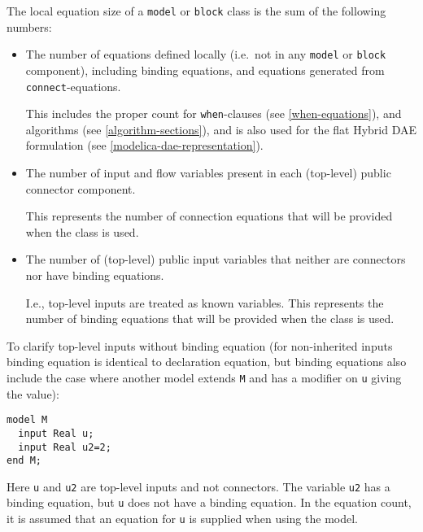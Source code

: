 \begin{definition}
The local equation size of a \lstinline!model! or \lstinline!block! class is the sum of the following numbers:
\begin{itemize}
\item
  The number of equations defined locally (i.e.\ not in any \lstinline!model! or \lstinline!block! component), including binding equations, and equations generated from \lstinline!connect!-equations.
  \begin{nonnormative}
  This includes the proper count for \lstinline!when!-clauses (see \cref{when-equations}), and algorithms (see \cref{algorithm-sections}), and is also used for
  the flat Hybrid DAE formulation (see \cref{modelica-dae-representation}).
  \end{nonnormative}
\item
  The number of input and flow variables present in each (top-level) public connector component.
  \begin{nonnormative}
  This represents the number of connection equations that will be provided when the class is used.
  \end{nonnormative}
\item
  The number of (top-level) public input variables that neither are connectors nor have binding equations.
  \begin{nonnormative}
  I.e., top-level inputs are treated as known variables.  This represents the number of binding equations that will be provided when the class is used.
  \end{nonnormative}
\end{itemize}
\end{definition}

\begin{nonnormative}
To clarify top-level inputs without binding equation (for
non-inherited inputs binding equation is identical to declaration
equation, but binding equations also include the case where another
model extends \lstinline!M! and has a modifier on \lstinline!u! giving the value):
\begin{lstlisting}[language=modelica]
model M
  input Real u;
  input Real u2=2;
end M;
\end{lstlisting}

Here \lstinline!u! and \lstinline!u2! are top-level inputs and not connectors. The
variable \lstinline!u2! has a binding equation, but \lstinline!u! does not have a binding
equation. In the equation count, it is assumed that an equation for \lstinline!u! is
supplied when using the model.
\end{nonnormative}

